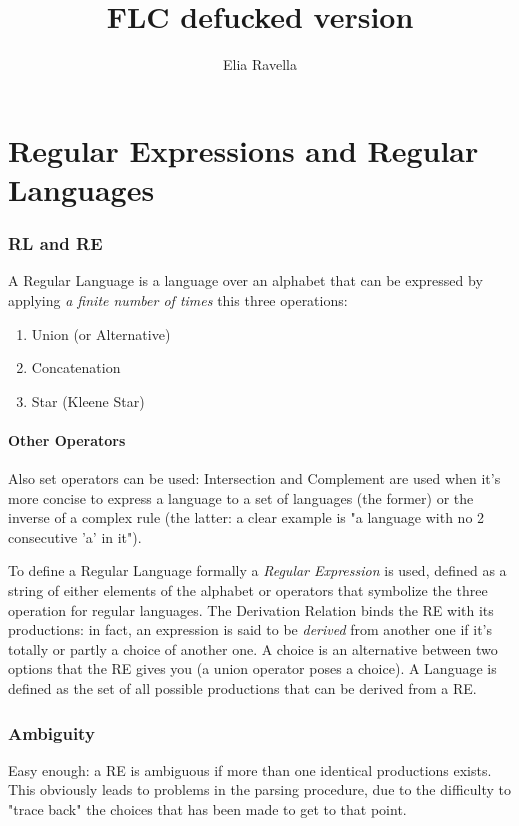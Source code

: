 \documentclass[10pt,a4paper]{article}
\author{Elia Ravella}
\title{FLC defucked version}
\begin{document}
	\begin{titlepage}
		\maketitle
	\end{titlepage}

	\tableofcontents
	\clearpage
	
	\part{Regular Expressions and Regular Languages}
		\section{RL and RE}
			A Regular Language is a language over an alphabet that can be expressed by applying \emph{a finite number of times} this three operations:
			\begin{enumerate}
				\item Union (or Alternative)
				\item Concatenation
				\item Star (Kleene Star)
			\end{enumerate}
			
			\subsection{Other Operators}
				Also set operators can be used: Intersection and Complement are used when it's more concise to express a language to a set of languages (the former) or the inverse of a complex rule (the latter: a clear example is "a language with no 2 consecutive 'a' in it").
			
			To define a Regular Language formally a \emph{Regular Expression} is used, defined as a string of either elements of the alphabet or operators that symbolize the three operation for regular languages.
			The Derivation Relation binds the RE with its productions: in fact, an expression is said to be \emph{derived} from another one if it's totally or partly a choice of another one. A choice is an alternative between two options that the RE gives you (a union operator poses a choice). A Language is defined as the set of all possible productions that can be derived from a RE.
		
		\section{Ambiguity}
			Easy enough: a RE is ambiguous if more than one identical productions exists. This obviously leads to problems in the parsing procedure, due to the difficulty to "trace back" the choices that has been made to get to that point. 
		
\end{document}
